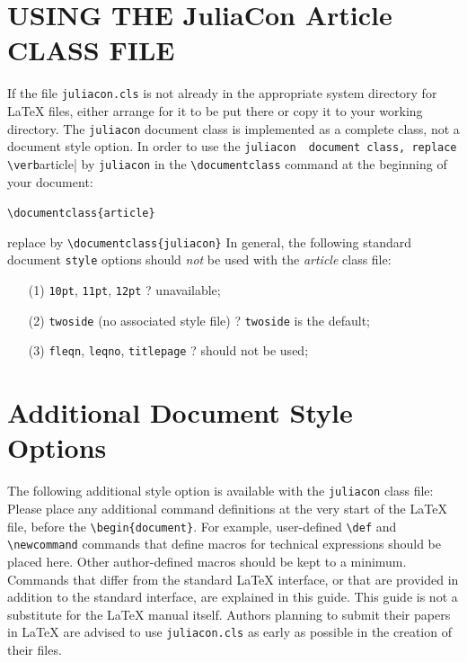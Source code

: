 \documentclass{juliacon}
\begin{document}
\section{USING THE JuliaCon Article CLASS FILE}

If the file \verb|juliacon.cls|  is not already in the appropriate system directory
for \LaTeX{} files, either arrange for it to be put there or copy
it to your working directory. The \verb|juliacon|  document class is implemented
as a complete class, not a document style option. In order to
use the \verb|juliacon  document class, replace \verb|article|  by \verb|juliacon|  in the
\verb|\documentclass|  command at the beginning of your document:
\vskip 6pt
\begin{centering}
    \verb|\documentclass{article}|  \end{centering}
\vskip 6pt
replace by
\vskip 6pt
 \verb|\documentclass{juliacon}|  \vskip 6pt
In general, the following standard document \verb|style|  options should
{ \itshape not} be used with the {\footnotesize \itshape article} class file:
\begin{enumerate}
\item[(1)] \verb|10pt|,  \verb|11pt|,  \verb|12pt|   ? unavailable;
\item[(2)] \verb|twoside|  (no associated style file) ? \verb|twoside|  is the default;
\item[(3)] \verb|fleqn|, \verb|leqno|, \verb|titlepage| ? should not be used;
\end{enumerate}

\section{Additional Document Style Options}
\label{sec:additional_doc}
%
The following additional style option is available with the \verb|juliacon|  class file:
\vskip 6pt
Please place any additional command definitions at the very start of
the \LaTeX{} file, before the \verb|\begin{document}|. For example, user-defined
\verb|\def|  and \verb|\newcommand|   commands that define macros for
technical expressions should be placed here. Other author-defined
macros should be kept to a minimum.
\vskip 6pt
Commands that differ from the standard \LaTeX{} interface, or that
are provided in addition to the standard interface, are explained in
this guide. This guide is not a substitute for the \LaTeX{} manual itself.
Authors planning to submit their papers in \LaTeX{} are advised to use
\verb|juliacon.cls|  as early as possible in the creation of their files.
\end{document}
